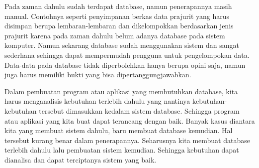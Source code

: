 \documentclass[a4paper, 12 pt]{article}
\begin{document}
		\par Pada zaman dahulu sudah terdapat database, namun penerapannya masih manual. Contohnya seperti penyimpanan berkas data prajurit yang harus disimpan berupa lembaran-lembaran dan dikelompokkan berdasarkan jenis prajurit karena pada zaman dahulu 			belum adanya database pada sistem komputer. Namun sekarang database sudah menggunakan sistem dan sangat sederhana sehingga dapat mempermudah pengguna untuk pengelompokan data. Data-data pada database tidak diperbolehkan hanya berupa opini 			saja, namun juga harus memiliki bukti yang bisa dipertanggungjawabkan. \linebreak

		\par Dalam pembuatan program atau aplikasi yang membutuhkan database, kita harus menganalisis kebutuhan terlebih dahulu yang nantinya kebutuhan-kebutuhan tersebut	dimasukkan kedalam sistem database. Sehingga program atau aplikasi yang kita buat 	dapat 		terancang dengan baik. Banyak kasus diantara kita yang membuat sistem dahulu, baru membuat database kemudian. Hal tersebut kurang benar dalam penerapannya. Seharusnya kita membuat database terlebih dahulu lalu pembuatan sistem kemudian. Sehingga 			kebutuhan dapat dianalisa dan dapat terciptanya sistem yang baik.
\end{document}
